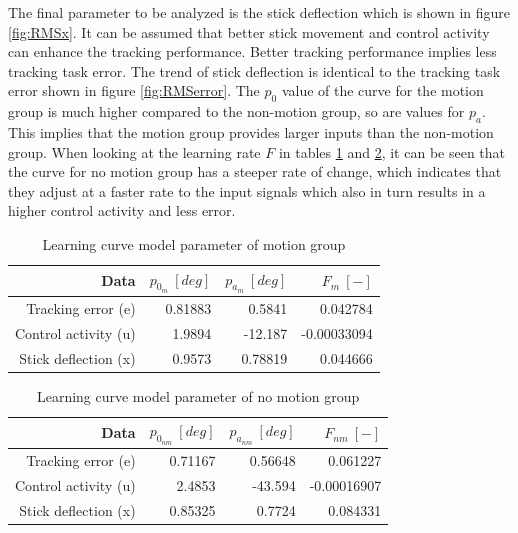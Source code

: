 \documentclass[conference]{IEEEtran}
\begin{document}
The final parameter to be analyzed is the stick deflection which is shown in figure \ref{fig:RMSx}. It can be assumed  that better stick movement and control activity can enhance the tracking performance. Better tracking performance implies less tracking task error. The trend of stick deflection is identical to the tracking task error shown in figure \ref{fig:RMSerror}. The $p_0$ value of the curve for the motion group is much higher compared to the non-motion group, so are values for $p_a$. This implies that the motion group provides larger inputs than the non-motion group. When looking at the learning rate $F$ in tables \ref{Motion group learning data} and \ref{NonMotion group learning data}, it can be seen that the curve for no motion group has a steeper rate of change, which indicates that they adjust at a faster rate to the input signals which also in turn results in a higher control activity and less error. \\

\begin{table}[h!]
\centering
\caption{Learning curve model parameter of motion group}
\begin{tabular}{r|r|r|r}
Data & $p_{0_m}\ [deg]$ & $p_{a_m}\ [deg]$ & $F_m\ [-]$\\
\hline
\hline
Tracking error (e) & 0.81883 & 0.5841 & 0.042784\\
Control activity (u)  & 1.9894 & -12.187 & -0.00033094 \\
Stick deflection (x) & 0.9573 & 0.78819 & 0.044666  \\
\end{tabular}
\label{Motion group learning data}
\end{table}

\begin{table}[h!]
\centering
\caption{Learning curve model parameter of no motion group}
\begin{tabular}{r|r|r|r}
Data & $p_{0_{nm}}\ [deg]$ & $p_{a_{nm}}\ [deg]$ & $F_{nm}\ [-]$\\
\hline
\hline
Tracking error (e)  & 0.71167 & 0.56648 & 0.061227 \\
Control activity (u) &  2.4853 & -43.594 & -0.00016907 \\
Stick deflection (x)  & 0.85325 & 0.7724 & 0.084331 \\
\end{tabular}
\label{NonMotion group learning data}
\end{table}
\end{document}
